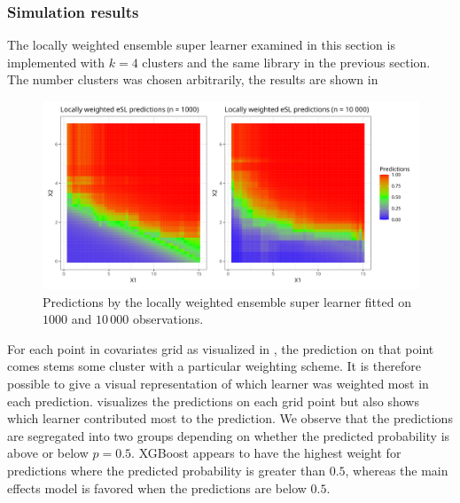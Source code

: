 \documentclass[./main.tex]{subfiles}
\begin{document}
\subsubsection{Simulation results}
The locally weighted ensemble super learner examined in this section is implemented with $ k = 4 $ clusters and the same library in the previous section. The number clusters was chosen arbitrarily, the results are shown in 
\begin{figure}[H]
    \centering
    \includegraphics[width=\textwidth]{figures/esl_preds_lw.png}
    \caption{Predictions by the locally weighted ensemble super learner fitted on $ 1000 $ and $ 10\,000 $ observations.}
    \label{fig:esl_preds_lw}
\end{figure}
For each point in covariates grid as visualized in , the prediction on that point comes stems some cluster with a particular weighting scheme. It is therefore possible to give a visual representation of which learner was weighted most in each prediction.  visualizes the predictions on each grid point but also shows which learner contributed most to the prediction. We observe that the predictions are segregated into two groups depending on whether the predicted probability is above or below $ p = 0.5 $. XGBoost appears to have the highest weight for predictions where the predicted probability is greater than $ 0.5 $, whereas the main effects model is favored when the predictions are below $ 0.5 $. 
\end{document}
